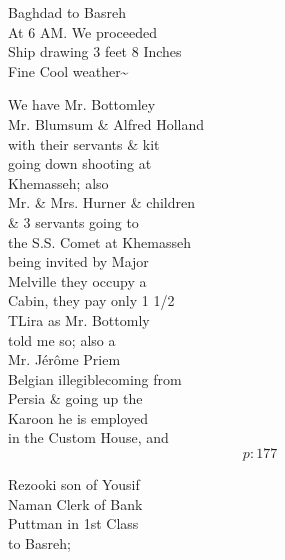 \documentclass{report}
\begin{document}



	\par{
 	Baghdad to Basreh\ \\At 6 AM. We proceeded\ \\Ship drawing 3 feet 8 Inches\ \\Fine Cool weather\~{}\ \\
	}

	\par{
 	We have Mr. Bottomley\ \\Mr. Blumsum \& Alfred Holland\ \\with their servants \& kit\ \\going down shooting at\ \\Khemasseh; also\ \\Mr. \& Mrs. Hurner \& children\ \\\& 3 servants going to\ \\the S.S. Comet at Khemasseh\ \\being invited by Major\ \\Melville they occupy a\ \\Cabin, they pay only 1 1/2\ \\TLira as Mr. Bottomly\ \\told me so; also a\ \\Mr. Jérôme Priem\ \\Belgian \lbrack illegible\rbrack coming from\ \\Persia \& going up the\ \\Karoon he is employed\ \\in the Custom House, and\ \\
  \[p: 177 \]

	}



	\par{
 	Rezooki son of Yousif\ \\Naman Clerk of Bank\ \\Puttman in 1st Class\ \\to Basreh;\ \\
	}
\end{document}
